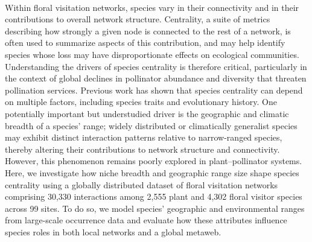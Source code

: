 \documentclass{article}
\begin{document}

\paragraph*{} Within floral visitation networks, species vary in their connectivity and in their contributions to overall network structure. Centrality, a suite of metrics describing how strongly a given node is connected to the rest of a network, is often used to summarize aspects of this contribution, and may help identify species whose loss may have disproportionate effects on ecological communities. Understanding the drivers of species centrality is therefore critical, particularly in the context of global declines in pollinator abundance and diversity that threaten pollination services. Previous work has shown that species centrality can depend on multiple factors, including species traits and evolutionary history. One potentially important but understudied driver is the geographic and climatic breadth of a species’ range; widely distributed or climatically generalist species may exhibit distinct interaction patterns relative to narrow-ranged species, thereby altering their contributions to network structure and connectivity. However, this phenomenon remains poorly explored in plant–pollinator systems. Here, we investigate how niche breadth and geographic range size shape species centrality using a globally distributed dataset of floral visitation networks comprising 30,330 interactions among 2,555 plant and 4,302 floral visitor species across 99 sites. To do so, we model species’ geographic and environmental ranges from large-scale occurrence data and evaluate how these attributes influence species roles in both local networks and a global metaweb.


\end{document}
